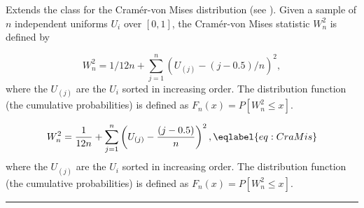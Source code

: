 
Extends the class  for the
Cram\'er-von Mises distribution (see \cite{tDUR73a,tSTE70a,tSTE86b}).
Given a sample of $n$ independent uniforms $U_i$ over $[0,1]$,
the Cram\'er-von Mises statistic $W_n^2$  is defined by
\begin{htmlonly}
  \begin {equation}
     W_n^2 = {1/12n} +
            \sum_{j=1}^n \left(U_{(j)} - {(j-0.5) / n}\right)^2,
  \end {equation}
  where the $U_{(j)}$ are the $U_i$ sorted in increasing order.
  The  distribution function (the cumulative probabilities)
  is defined as $F_n(x) = P[W_n^2 \le x]$.
\end{htmlonly}%
\begin{latexonly}%
  \begin {equation}
     W_n^2 = \frac{1}{12n} +
            \sum_{j=1}^n \left(U_{(j)} - \frac{(j-0.5)}{n}\right)^2,
                                                   \eqlabel {eq:CraMis}
  \end {equation}
  where the $U_{(j)}$ are the $U_i$ sorted in increasing order.
  The  distribution function (the cumulative probabilities)
  is defined as $F_n(x) = P[W_n^2 \le x]$.
\end{latexonly}%

\bigskip\hrule

